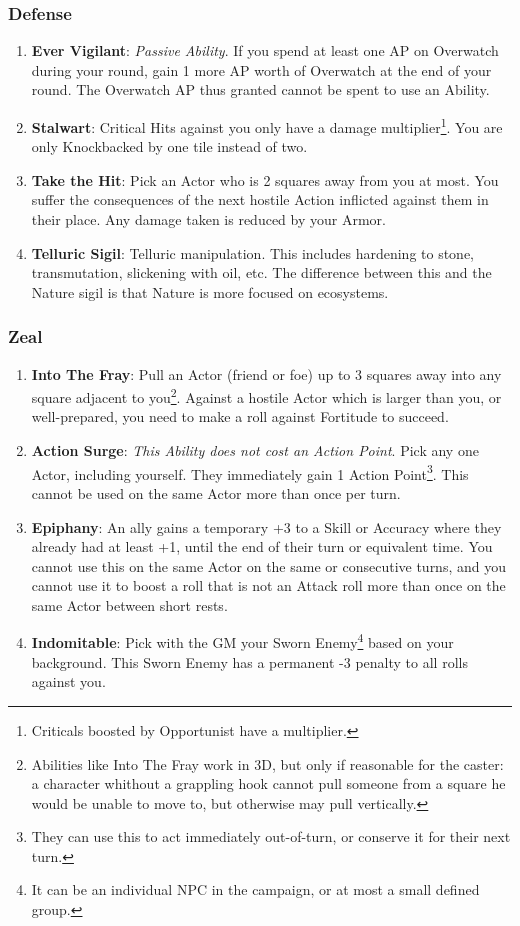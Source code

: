 \subsubsection{Defense}
\begin{enumerate}
    \item \textbf{Ever Vigilant}: \textit{Passive Ability}. If you spend at least one AP on Overwatch during your round, gain 1 more AP worth of Overwatch at the end of your round. The Overwatch AP thus granted cannot be spent to use an Ability.
    \item \textbf{Stalwart}: Critical Hits against you only have a  damage multiplier\footnote{Criticals boosted by Opportunist have a  multiplier.}. You are only Knockbacked by one tile instead of two.
    \item \textbf{Take the Hit}: Pick an Actor who is 2 squares away from you at most. You suffer the consequences of the next hostile Action inflicted against them in their place. Any damage taken is reduced by your Armor.
    \item \textbf{Telluric Sigil}: Telluric manipulation. This includes hardening to stone, transmutation, slickening with oil, etc. The difference between this and the Nature sigil is that Nature is more focused on ecosystems.
\end{enumerate}

\subsubsection{Zeal}
\begin{enumerate}
    \item \textbf{Into The Fray}: Pull an Actor (friend or foe) up to 3 squares away into any square adjacent to you\footnote{Abilities like Into The Fray work in 3D, but only if reasonable for the caster: a character whithout a grappling hook cannot pull someone from a square he would be unable to move to, but otherwise may pull vertically.}. Against a hostile Actor which is larger than you, or well-prepared, you need to make a roll against Fortitude to succeed.
    \item \textbf{Action Surge}: \textit{This Ability does not cost an Action Point}. Pick any one Actor, including yourself. They immediately gain 1 Action Point\footnote{They can use this to act immediately out-of-turn, or conserve it for their next turn.}. This cannot be used on the same Actor more than once per turn.
    \item \textbf{Epiphany}: An ally gains a temporary +3 to a Skill or Accuracy where they already had at least +1, until the end of their turn or equivalent time. You cannot use this on the same Actor on the same or consecutive turns, and you cannot use it to boost a roll that is not an Attack roll more than once on the same Actor between short rests.
    \item \textbf{Indomitable}: Pick with the GM your Sworn Enemy\footnote{It can be an individual NPC in the campaign, or at most a small defined group.} based on your background. This Sworn Enemy has a permanent -3 penalty to all rolls against you.
\end{enumerate}


